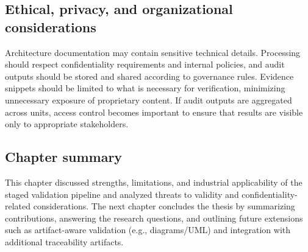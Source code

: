 \subsection{Ethical, privacy, and organizational considerations}
\label{sec:discussion_ethics}

Architecture documentation may contain sensitive technical details. Processing should respect confidentiality requirements and internal policies, and audit outputs should be stored and shared according to governance rules. Evidence snippets should be limited to what is necessary for verification, minimizing unnecessary exposure of proprietary content. If audit outputs are aggregated across units, access control becomes important to ensure that results are visible only to appropriate stakeholders.

\subsection{Chapter summary}
\label{sec:discussion_summary}

This chapter discussed strengths, limitations, and industrial applicability of the staged validation pipeline and analyzed threats to validity and confidentiality-related considerations. The next chapter concludes the thesis by summarizing contributions, answering the research questions, and outlining future extensions such as artifact-aware validation (e.g., diagrams/UML) and integration with additional traceability artifacts.
